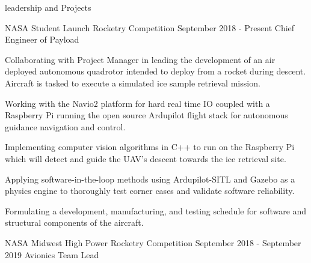 \documentclass{resume} %
\begin{document}

    \begin{rSection} {leadership and Projects}

        \begin{rSubsection} {NASA Student Launch Rocketry Competition} {September 2018 - Present} {Chief Engineer of Payload}

            \item Collaborating with Project Manager in leading the development of an air deployed autonomous quadrotor intended to deploy from a rocket during descent. Aircraft is tasked to execute a simulated ice sample retrieval mission.
            \item Working with the Navio2 platform for hard real time IO coupled with a Raspberry Pi running the open source Ardupilot flight stack for autonomous guidance navigation and control.
            \item Implementing computer vision algorithms in C++ to run on the Raspberry Pi which will detect and guide the UAV's descent towards the ice retrieval site.
            \item Applying software-in-the-loop methods using Ardupilot-SITL and Gazebo as a physics engine to thoroughly test corner cases and validate software reliability.
            \item Formulating a development, manufacturing, and testing schedule for software and structural components of the aircraft.


        \end{rSubsection}



        \begin{rSubsection} {NASA Midwest High Power Rocketry Competition} {September 2018 - September 2019} {Avionics Team Lead}


\end{rSubsection}
\end{rSection}
\end{document}
